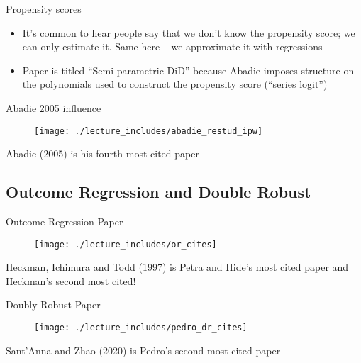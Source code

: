 \documentclass{beamer}
\begin{document}
\begin{frame}{Propensity scores}

\begin{itemize}
\item It's common to hear people say that we don't know the propensity score; we can only estimate it. Same here -- we approximate it with regressions
\item Paper is titled ``Semi-parametric DiD'' because Abadie imposes structure on the polynomials used to construct the propensity score (``series logit'')
\end{itemize}

\end{frame}



\begin{frame}{Abadie 2005 influence}

	\begin{figure}
	\texttt{[image: ./lecture\_includes/abadie\_restud\_ipw]}
	\end{figure}Abadie (2005) is his fourth most cited paper

\end{frame}




\subsection{Outcome Regression and Double Robust}

\begin{frame}{Outcome Regression Paper}

	\begin{figure}
	\texttt{[image: ./lecture\_includes/or\_cites]}
	\end{figure}Heckman, Ichimura and Todd (1997) is Petra and Hide's most cited paper and Heckman's second most cited!

\end{frame}



\begin{frame}{Doubly Robust Paper}

	\begin{figure}
	\texttt{[image: ./lecture\_includes/pedro\_dr\_cites]}
	\end{figure}Sant'Anna and Zhao (2020) is Pedro's second most cited paper

\end{frame}
\end{document}
